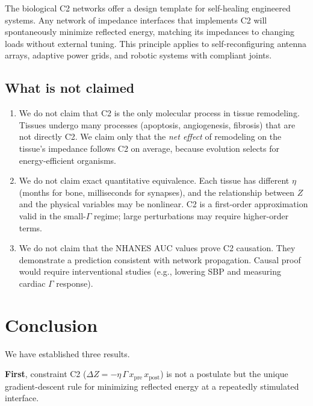 \documentclass[aps,pre,twocolumn,superscriptaddress,floatfix]{revtex4-2}
\begin{document}
The biological C2 networks offer a design template for
self-healing engineered systems.  Any network of impedance
interfaces that implements C2 will spontaneously
minimize reflected energy, matching its impedances to
changing loads without external tuning.  This principle
applies to self-reconfiguring antenna arrays, adaptive
power grids, and robotic systems with compliant joints.

\subsection{What is not claimed}

\begin{enumerate}
  \item We do not claim that C2 is the only molecular
    process in tissue remodeling.  Tissues undergo
    many processes (apoptosis, angiogenesis, fibrosis)
    that are not directly C2.  We claim only that
    the \emph{net effect} of remodeling on the
    tissue's impedance follows C2 on average, because
    evolution selects for energy-efficient organisms.

  \item We do not claim exact quantitative equivalence.
    Each tissue has different $\eta$ (months for bone,
    milliseconds for synapses), and the relationship
    between $Z$ and the physical variables may be
    nonlinear.  C2 is a first-order approximation valid
    in the small-$\Gamma$ regime; large perturbations
    may require higher-order terms.

  \item We do not claim that the NHANES AUC values
    prove C2 causation.  They demonstrate a prediction
    consistent with network propagation.  Causal proof
    would require interventional studies (e.g., lowering
    SBP and measuring cardiac $\Gamma$ response).
\end{enumerate}


\section{Conclusion}
\label{sec:conclusion}

We have established three results.

\textbf{First}, constraint C2
($\Delta Z = -\eta\,\Gamma\,x_{\text{pre}}\,x_{\text{post}}$)
is not a postulate but the unique gradient-descent rule
for minimizing reflected energy at a repeatedly stimulated
interface.
\end{document}
